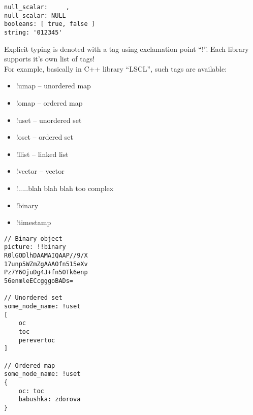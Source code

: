 \begin{lstlisting}[caption = miscellaneous]
null_scalar:     ,
null_scalar: NULL
booleans: [ true, false ]
string: '012345'
\end{lstlisting}

Explicit typing is denoted with a tag using exclamation point ``!''. Each library supports it's own list of tags! \\
For example, basically in C++ library ``LSCL'', such tags are available:
\begin{itemize}
	\item !umap -- unordered map
	\item !omap -- ordered map
	\item !uset -- unordered set
	\item !oset -- ordered set
	\item !llist -- linked list
	\item !vector -- vector
	\item !.....blah blah blah too complex
	\item !binary
	\item !timestamp
\end{itemize}

\begin{lstlisting}[caption = various explicit tags]
// Binary object
picture: !!binary 
R0lGODlhDAAMAIQAAP//9/X
17unp5WZmZgAAAOfn515eXv
Pz7Y6OjuDg4J+fn5OTk6enp
56enmleECcgggoBADs=

// Unordered set
some_node_name: !uset
[
	oc
	toc
	perevertoc
]

// Ordered map
some_node_name: !uset
{
	oc: toc
	babushka: zdorova
}
\end{lstlisting}




